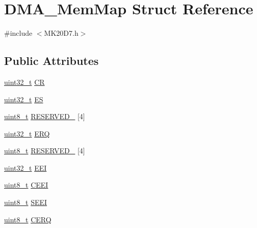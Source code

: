 \hypertarget{struct_d_m_a___mem_map}{}\section{D\+M\+A\+\_\+\+Mem\+Map Struct Reference}
\label{struct_d_m_a___mem_map}


{\ttfamily \#include $<$M\+K20\+D7.\+h$>$}

\subsection*{Public Attributes}
\begin{DoxyCompactItemize}
\item 
\hyperlink{_p_e___types_8h_a33594304e786b158f3fb30289278f5af}{uint32\+\_\+t} \hyperlink{struct_d_m_a___mem_map_ac2a6179596986e5c7b8794eaab4166e3}{CR}
\item 
\hyperlink{_p_e___types_8h_a33594304e786b158f3fb30289278f5af}{uint32\+\_\+t} \hyperlink{struct_d_m_a___mem_map_a4c51938d27cc66f0d060c66ec7089ec7}{ES}
\item 
\hyperlink{_p_e___types_8h_aba7bc1797add20fe3efdf37ced1182c5}{uint8\+\_\+t} \hyperlink{struct_d_m_a___mem_map_ab577c720104f909159f824bc5c7d6550}{R\+E\+S\+E\+R\+V\+E\+D\+\_} \mbox{[}4\mbox{]}
\item 
\hyperlink{_p_e___types_8h_a33594304e786b158f3fb30289278f5af}{uint32\+\_\+t} \hyperlink{struct_d_m_a___mem_map_a5dd80d7a64d93b113f306641b42d4365}{E\+RQ}
\item 
\hyperlink{_p_e___types_8h_aba7bc1797add20fe3efdf37ced1182c5}{uint8\+\_\+t} \hyperlink{struct_d_m_a___mem_map_ac8aa0a62f13eef051c84cb582a8ec821}{R\+E\+S\+E\+R\+V\+E\+D\+\_} \mbox{[}4\mbox{]}
\item 
\hyperlink{_p_e___types_8h_a33594304e786b158f3fb30289278f5af}{uint32\+\_\+t} \hyperlink{struct_d_m_a___mem_map_af6d4e36800f891e548be42bb47e36aef}{E\+EI}
\item 
\hyperlink{_p_e___types_8h_aba7bc1797add20fe3efdf37ced1182c5}{uint8\+\_\+t} \hyperlink{struct_d_m_a___mem_map_a02b835eb33ce21b8b3170304a72fccc2}{C\+E\+EI}
\item 
\hyperlink{_p_e___types_8h_aba7bc1797add20fe3efdf37ced1182c5}{uint8\+\_\+t} \hyperlink{struct_d_m_a___mem_map_a576075e4d10859c84e48e7abc1e030aa}{S\+E\+EI}
\item 
\hyperlink{_p_e___types_8h_aba7bc1797add20fe3efdf37ced1182c5}{uint8\+\_\+t} \hyperlink{struct_d_m_a___mem_map_a1e78a98a5a2aca80d229f7c055dc9ff1}{C\+E\+RQ}

\end{DoxyCompactItemize}
